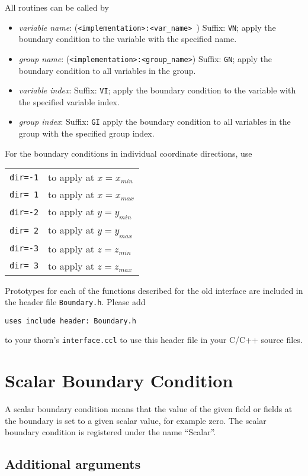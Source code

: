 \documentclass{article}
\begin{document}
All routines can be called by
\begin{itemize}
\item{\em variable name}: ({\tt <implementation>:<var\_name> }) Suffix:
{\tt VN}; apply the boundary condition to the variable with the
specified name.
\item{\em group name}: ({\tt <implementation>:<group\_name>}) Suffix:
{\tt GN}; apply the boundary condition to all variables in the group.
\item{\em variable index}:  Suffix: {\tt VI}; apply the boundary
condition to the variable with the specified variable index.
\item{\em group index}:  Suffix: {\tt GI} apply the boundary
condition to all variables in the group with the specified group index.
\end{itemize}

For the boundary conditions in individual coordinate directions, use\\
\begin{tabular}{ll}
{\tt dir=-1} & to apply at $x=x_{min}$ \\
{\tt dir= 1} & to apply at $x=x_{max}$ \\
{\tt dir=-2} & to apply at $y=y_{min}$ \\
{\tt dir= 2} & to apply at $y=y_{max}$ \\
{\tt dir=-3} & to apply at $z=z_{min}$ \\
{\tt dir= 3} & to apply at $z=z_{max}$ \\
\end{tabular} 

Prototypes for each of the functions described for the old interface
are included in the header file \texttt{Boundary.h}.  Please add
\begin{verbatim}
uses include header: Boundary.h
\end{verbatim}
to your thorn's \texttt{interface.ccl} to use this header file in your C/C++
source files.

\section{Scalar Boundary Condition}

A scalar boundary condition means that the value of the given 
field or fields at the boundary is set to a given scalar value, for 
example zero.  The scalar boundary condition is registered under the name ``Scalar''.

\subsection{Additional arguments}
\end{document}
